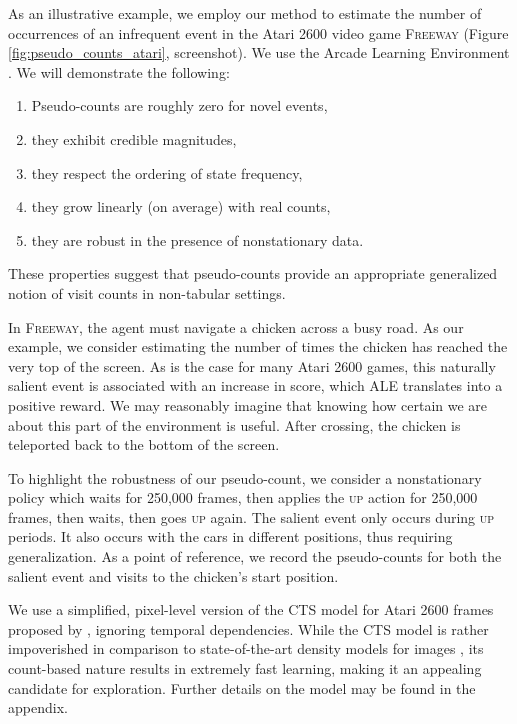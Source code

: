 \documentclass{article}
\newcommand{\gamename}[1]{\textsc{#1}}
\begin{document}
As an illustrative example, we employ our method to estimate the number of occurrences of an infrequent event in the Atari 2600 video game \gamename{Freeway} (Figure \ref{fig:pseudo_counts_atari}, screenshot). We use the Arcade Learning Environment \citep{bellemare13arcade}. We will demonstrate the following:
\begin{enumerate}
    \item{Pseudo-counts are roughly zero for novel events,}
    \item{they exhibit credible magnitudes,}
    \item{they respect the ordering of state frequency,}
    \item{they grow linearly (on average) with real counts,}
    \item{they are robust in the presence of nonstationary data.} 
\end{enumerate}
These properties suggest that pseudo-counts provide an appropriate generalized notion of visit counts in non-tabular settings.

In \gamename{Freeway}, the agent must navigate a chicken across a busy road. As our example, we consider estimating the number of times the chicken has reached the very top of the screen. As is the case for many Atari 2600 games, this naturally salient event is associated with an increase in score, which ALE translates into a positive reward. We may reasonably imagine that knowing how certain we are about this part of the environment is useful. After crossing, the chicken is teleported back to the bottom of the screen.

To highlight the robustness of our pseudo-count, we consider a nonstationary policy which waits for 250,000 frames, then applies the \textsc{up} action for 250,000 frames, then waits, then goes \textsc{up} again. The salient event only occurs during \textsc{up} periods. It also occurs with the cars in different positions, thus requiring generalization.
As a point of reference, we record the pseudo-counts for both the salient event and visits to the chicken's start position.

We use a simplified, pixel-level version of the CTS model for Atari 2600 frames proposed by \citet{bellemare14skip}, ignoring temporal dependencies. While the CTS model is rather impoverished in comparison to state-of-the-art density models for images \citep[e.g.][]{vandenoord16pixel},
its count-based nature results in extremely fast learning, making it an appealing candidate for exploration. Further details on the model may be found in the appendix.
\end{document}

